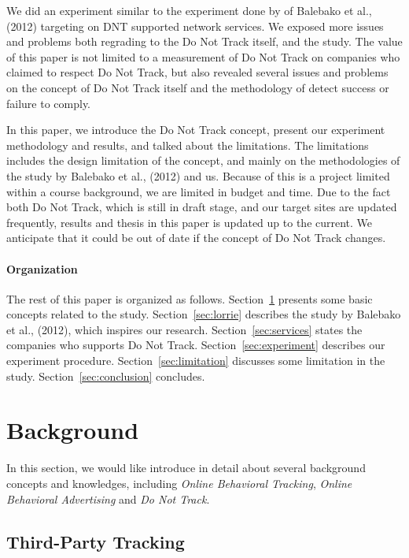 \documentclass{sig-alternate}
\begin{document}
We did an experiment similar to the experiment done by of Balebako et al., (2012) targeting on DNT supported network services. We exposed more issues and problems both regrading to the Do Not Track itself, and the study. The value of this paper is not limited to a measurement of Do Not Track on companies who claimed to respect Do Not Track, but also revealed several issues and problems on the concept of Do Not Track itself and the methodology of detect success or failure to comply.

In this paper, we introduce the Do Not Track concept, present our experiment methodology and results, and talked about the limitations. The limitations includes the design limitation of the concept, and mainly on the methodologies of the study by Balebako et al., (2012) and us. Because of this is a project limited within a course background, we are limited in budget and time. Due to the fact both Do Not Track, which is still in draft stage, and our target sites are updated frequently, results and thesis in this paper is updated up to the current. We anticipate that it could be out of date if the concept of Do Not Track changes.

\paragraph{Organization}
The rest of this paper is organized as follows. Section~\ref{sec:background} presents some basic concepts related to the study.  Section~\ref{sec:lorrie} describes the study by Balebako et al., (2012), which inspires our research. Section~\ref{sec:services} states the companies who supports Do Not Track. Section~\ref{sec:experiment} describes our experiment procedure. Section~\ref{sec:limitation} discusses some limitation in the study. Section~\ref{sec:conclusion} concludes.

\section{Background} \label{sec:background}

In this section, we would like introduce in detail about several background concepts and knowledges, including \emph{Online Behavioral Tracking}, \emph{Online Behavioral Advertising} and \emph{Do Not Track}. 
\subsection*{Third-Party Tracking}
\end{document}
